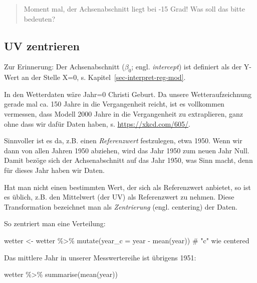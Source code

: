 \documentclass[
  letterpaper,
]{scrbook}
\newenvironment{Shaded}{\begin{snugshade}}{\end{snugshade}}
\newcommand{\AttributeTok}[1]{\textcolor[rgb]{0.40,0.45,0.13}{#1}}
\newcommand{\CommentTok}[1]{\textcolor[rgb]{0.37,0.37,0.37}{#1}}
\newcommand{\FunctionTok}[1]{\textcolor[rgb]{0.28,0.35,0.67}{#1}}
\newcommand{\NormalTok}[1]{\textcolor[rgb]{0.00,0.23,0.31}{#1}}
\newcommand{\OtherTok}[1]{\textcolor[rgb]{0.00,0.23,0.31}{#1}}
\newcommand{\SpecialCharTok}[1]{\textcolor[rgb]{0.37,0.37,0.37}{#1}}
\theoremstyle{definition}
\theoremstyle{definition}
\theoremstyle{definition}
\theoremstyle{remark}
\begin{document}
\begin{quote}
{} Moment mal, der Achsenabschnitt liegt bei -15 Grad!
Was soll das bitte bedeuten?
\end{quote}

\subsection{UV zentrieren}\label{uv-zentrieren}

Zur Erinnerung: Der Achsenabschnitt (\(\beta_0\); engl.
\emph{intercept}) ist definiert als der Y-Wert an der Stelle X=0, s.
Kapitel~\ref{sec-interpret-reg-mod}.

In den Wetterdaten wäre Jahr=0 Christi Geburt. Da unsere
Wetteraufzeichnung gerade mal ca. 150 Jahre in die Vergangenheit reicht,
ist es vollkommen vermessen, dass Modell 2000 Jahre in die Vergangenheit
zu extraplieren, ganz ohne dass wir dafür Daten haben, s.
\url{https://xkcd.com/605/}.

Sinnvoller ist es da, z.B. einen \emph{Referenzwert} festzulegen, etwa
1950. Wenn wir dann von allen Jahren 1950 abziehen, wird das Jahr 1950
zum neuen Jahr Null. Damit bezöge sich der Achsenabschnitt auf das Jahr
1950, was Sinn macht, denn für dieses Jahr haben wir Daten.

Hat man nicht einen bestimmten Wert, der sich als Referenzwert anbietet,
so ist es üblich, z.B. den Mittelwert (der UV) als Referenzwert zu
nehmen. Diese Transformation bezeichnet man als \emph{Zentrierung}
(engl. centering) der Daten.

So zentriert man eine Verteilung:

\begin{Shaded}
\begin{Highlighting}[]
\NormalTok{wetter }\OtherTok{\textless{}{-}}
\NormalTok{  wetter }\SpecialCharTok{\%\textgreater{}\%} 
  \FunctionTok{mutate}\NormalTok{(}\AttributeTok{year\_c =}\NormalTok{ year }\SpecialCharTok{{-}} \FunctionTok{mean}\NormalTok{(year))  }\CommentTok{\# "c" wie centered}
\end{Highlighting}
\end{Shaded}

Das mittlere Jahr in unserer Messwertereihe ist übrigens 1951:

\begin{Shaded}
\begin{Highlighting}[]
\NormalTok{wetter }\SpecialCharTok{\%\textgreater{}\%} 
  \FunctionTok{summarise}\NormalTok{(}\FunctionTok{mean}\NormalTok{(year))}
\end{Highlighting}
\end{Shaded}
\end{document}
